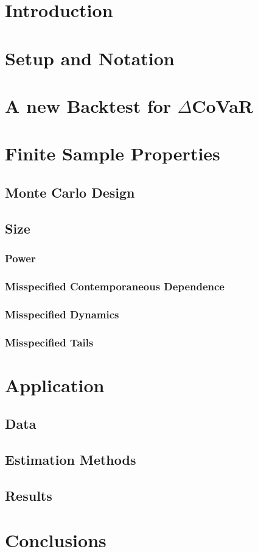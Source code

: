 \documentclass[12pt]{article}
\begin{document}
\newpage
{} %





\section{Introduction}
\section{Setup and Notation}
\section{A new Backtest for $\Delta$CoVaR}
\section{Finite Sample Properties}
\subsection{Monte Carlo Design}
\subsection{Size}
\subsubsection{Power}
\subsubsection{Misspecified Contemporaneous Dependence}
\subsubsection{Misspecified Dynamics}
\subsubsection{Misspecified Tails}
\section{Application}
\subsection{Data}
\subsection{Estimation Methods}
\subsection{Results}
\section{Conclusions}



\end{document}
